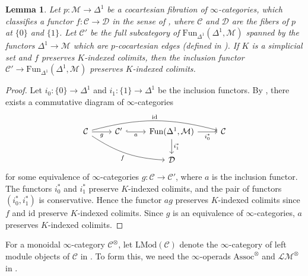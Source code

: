 \documentclass[10pt]{amsart}
\newtheorem{lem}[thm]{Lemma}
\theoremstyle{definition}
\numberwithin{equation}{section}
\newcommand{\cC}{\mathcal{C}}
\newcommand{\cD}{\mathcal{D}}
\newcommand{\cM}{\mathcal{M}}
\newcommand{\Fun}{\mathrm{Fun}}
\newcommand{\LMod}{\mathrm{LMod}}
\newcommand{\id}{\mathrm{id}}
\newcommand{\Assoc}{\mathrm{Assoc}}
\newcommand{\LM}{\mathcal{LM}}
\begin{document}
\begin{lem}
\label{module lemma}
Let $p\colon \cM\to \Delta^1$ be a cocartesian fibration of $\infty$-categories,
which classifies
a functor $f\colon \cC\to \cD$ in the sense of \cite[Definition 3.3.2.2]{HTT},
where $\cC$ and $\cD$ are the fibers of $p$ at $\{0\}$ and $\{1\}$.
Let $\cC'$ be the full subcategory of $\Fun_{\Delta^1}(\Delta^1,\cM)$ spanned by the functors $\Delta^1\to \cM$
which are $p$-cocartesian edges
(defined in \cite[Definition 2.4.11 and before Proposition 2.4.1.8]{HTT}).
If $K$ is a simplicial set and $f$ preserves $K$-indexed colimits,
then the inclusion functor $\cC'\to \Fun_{\Delta^1}(\Delta^1,\cM)$ preserves $K$-indexed colimits.
\end{lem}
\begin{proof}
Let $i_0\colon \{0\}\to \Delta^1$ and $i_1\colon \{1\}\to \Delta^1$ be the inclusion functors.
By \cite[Proof of Lemma 5.4.7.15]{HTT},
there exists a commutative diagram of $\infty$-categories
\[
\begin{tikzcd}
\cC\ar[r,"g"']\ar[rrd,"f"',bend right=15]\ar[rrr,bend left=15,"\id"]&
\cC'\ar[r,hookrightarrow,"a"']&
\Fun(\Delta^1,\cM)\ar[d,"i_1^*"]\ar[r,"i_0^*"']&
\cC
\\
&
&
\cD
\end{tikzcd}
\]
for some equivalence of $\infty$-categories $g\colon \cC\to \cC'$,
where $a$ is the inclusion functor.
The functors $i_0^*$ and $i_1^*$ preserve $K$-indexed colimits,
and the pair of functors $(i_0^*,i_1^*)$ is conservative.
Hence the functor $ag$ preserves $K$-indexed colimits since $f$ and $\id$ preserve $K$-indexed colimits.
Since $g$ is an equivalence of $\infty$-categories,
$a$ preserves $K$-indexed colimits.
\end{proof}


For a monoidal $\infty$-category $\cC^\otimes$,
let $\LMod(\cC)$ denote the $\infty$-category of left module objects of $\cC$ in \cite[Definition 4.2.1.13]{HA}.
To form this,
we need the $\infty$-operads $\Assoc^\otimes$ and $\LM^\otimes$ in \cite[Definitions 4.1.1.3, 4.2.1.7]{HA}.
\end{document}

